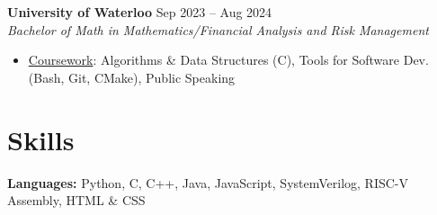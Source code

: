 \documentclass[10pt,letterpaper]{article}
\begin{document}

\raggedright
\textbf{University of Waterloo} \hfill
Sep 2023 -- Aug 2024 \\
\textit{Bachelor of Math in Mathematics/Financial Analysis and Risk Management} \hfill
\begin{itemize}
    \item \underline{Coursework}: 
    Algorithms \& Data Structures (C), 
    Tools for Software Dev. (Bash, Git, CMake), 
    Public Speaking
\end{itemize}













\section{Skills}

\hspace{0.75em}\textbf{Languages:} 
    Python, C, C++, Java, JavaScript, SystemVerilog, RISC-V Assembly, HTML \& CSS \\
\end{document}

